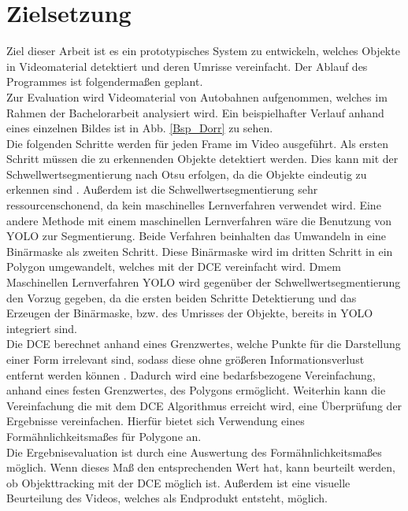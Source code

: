 \section{Zielsetzung}{ 
Ziel dieser Arbeit ist es ein prototypisches System zu entwickeln, welches Objekte in Videomaterial detektiert und deren Umrisse vereinfacht. Der Ablauf des Programmes ist folgendermaßen geplant. \\ 
Zur Evaluation wird Videomaterial von Autobahnen aufgenommen, welches im Rahmen der Bachelorarbeit analysiert wird. Ein beispielhafter Verlauf anhand eines einzelnen Bildes ist in Abb. \ref{Bsp_Dorr} zu sehen. \\
Die folgenden Schritte werden für jeden Frame im Video ausgeführt. 
Als ersten Schritt müssen die zu erkennenden Objekte detektiert werden. Dies kann mit der Schwellwertsegmentierung nach Otsu erfolgen, da die Objekte eindeutig zu erkennen sind \citep{Otsu1979}. Außerdem ist die Schwellwertsegmentierung sehr ressourcenschonend, da kein maschinelles Lernverfahren verwendet wird. Eine andere Methode mit einem maschinellen Lernverfahren wäre die Benutzung von YOLO zur Segmentierung. Beide Verfahren beinhalten das Umwandeln in eine Binärmaske als zweiten Schritt. Diese Binärmaske wird im dritten Schritt in ein Polygon umgewandelt, welches mit der DCE vereinfacht wird. Dmem Maschinellen Lernverfahren YOLO wird gegenüber der Schwellwertsegmentierung den Vorzug gegeben, da die ersten beiden Schritte Detektierung und das Erzeugen der Binärmaske, bzw. des Umrisses der Objekte, bereits in YOLO integriert sind.\\
Die DCE berechnet anhand eines Grenzwertes, welche Punkte für die Darstellung einer Form irrelevant sind, sodass diese ohne größeren Informationsverlust entfernt werden können \citep{Barkowsky2000}. Dadurch wird eine bedarfsbezogene Vereinfachung, anhand eines festen Grenzwertes, des Polygons ermöglicht. 
Weiterhin kann die Vereinfachung die mit dem DCE Algorithmus erreicht wird, eine Überprüfung der Ergebnisse vereinfachen. Hierfür bietet sich Verwendung eines Formähnlichkeitsmaßes für Polygone an. \\
Die Ergebnisevaluation ist durch eine Auswertung des Formähnlichkeitsmaßes möglich. Wenn dieses Maß den entsprechenden Wert hat, kann beurteilt werden, ob Objekttracking mit der DCE möglich ist. Außerdem ist eine visuelle Beurteilung des Videos, welches als Endprodukt entsteht, möglich.\\}
